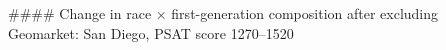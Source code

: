 #### Change in race × first-generation composition after excluding Geomarket: San Diego, PSAT score 1270–1520
